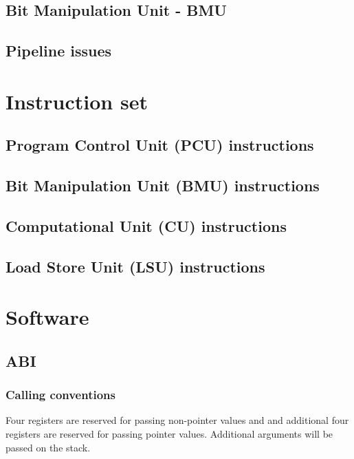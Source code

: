 \documentclass[11pt]{book}
\begin{document}
\section{Bit Manipulation Unit - BMU}

\section{Pipeline issues}

\newpage
\chapter{Instruction set}
\newpage
\section{Program Control Unit (PCU) instructions}

\newpage
\section{Bit Manipulation Unit (BMU) instructions}

\newpage
\section{Computational Unit (CU) instructions}

\newpage
\section{Load Store Unit (LSU) instructions}


\chapter{Software}
\section{ABI}
\subsection{Calling conventions}
Four registers are reserved for passing non-pointer values and and
additional four registers are reserved for passing pointer
values. Additional arguments will be passed on the stack.
\end{document}
